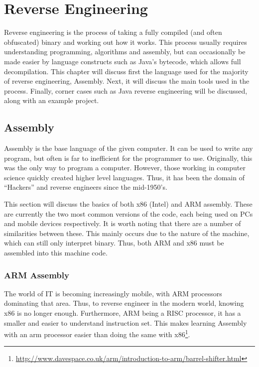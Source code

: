 \chapter{Reverse Engineering}
	\label{ch:ReverseEngineering}
	Reverse engineering is the process of taking a fully compiled (and often obfuscated) binary and working out how it works. 
	This process usually requires understanding programming, algorithms and assembly, but can occasionally be made easier by language constructs such as Java's bytecode, which allows full decompilation. 
	This chapter will discuss first the language used for the majority of reverse engineering, Assembly. 
	Next, it will discuss the main tools used in the process. 
	Finally, corner cases such as Java reverse engineering will be discussed, along with an example project. 

	\section{Assembly}
		Assembly is the base language of the given computer. 
		It can be used to write any program, but often is far to inefficient for the programmer to use. 
		Originally, this was the only way to program a computer. 
		However, those working in computer science quickly created higher level languages. 
		Thus, it has been the domain of ``Hackers'' and reverse engineers since the mid-1950's. 

		This section will discuss the basics of both x86 (Intel) and ARM assembly. 
		These are currently the two most common versions of the code, each being used on PCs and mobile devices respectively. 
		It is worth noting that there are a number of similarities between these. 
		This mainly occurs due to the nature of the machine, which can still only interpret binary. 
		Thus, both ARM and x86 must be assembled into this machine code. 
		\subsection{ARM Assembly}
			The world of IT is becoming increasingly mobile, with ARM processors dominating that area. 
			Thus, to reverse engineer in the modern world, knowing x86 is no longer enough. 
			Furthermore, ARM being a RISC processor, it has a smaller and easier to understand instruction set. 
			This makes learning Assembly with an arm processor easier than doing the same with x86\footnote{\url{http://www.davespace.co.uk/arm/introduction-to-arm/barrel-shifter.html}}. 

